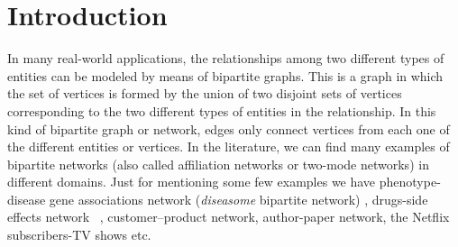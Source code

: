 \chapter{Introduction}\label{intro}
%

In many real-world applications, the relationships among two different types of entities can be modeled by means of bipartite graphs. 
This is a graph in which the set of vertices is formed by the union of two disjoint sets of vertices corresponding to the two different types of entities in the relationship. 
In this kind of bipartite graph or network, edges only connect vertices from each one of the different entities or vertices. In the literature, we can find many examples of bipartite networks (also called affiliation networks or two-mode networks) in different domains. 
Just for mentioning some few examples we have  phenotype-disease gene associations network (\textit{diseasome} bipartite network) \cite{goh2007human}, drugs-side effects network ~\cite{drugs}, customer–product network, author-paper network, the Netflix subscribers-TV shows etc.


